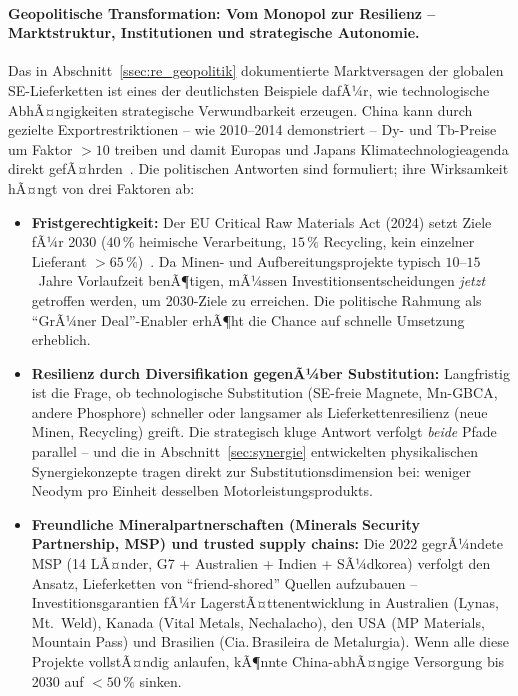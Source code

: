﻿\documentclass[12pt, a4paper]{report}
\theoremstyle{definition}
\theoremstyle{remark}
\begin{document}
\paragraph{Geopolitische Transformation: Vom Monopol zur Resilienz --
Marktstruktur, Institutionen und strategische Autonomie.}
Das in Abschnitt~\ref{ssec:re_geopolitik} dokumentierte Marktversagen
der globalen SE-Lieferketten ist eines der deutlichsten Beispiele dafÃ¼r,
wie technologische AbhÃ¤ngigkeiten strategische Verwundbarkeit erzeugen.
China kann durch gezielte Export\-restriktionen -- wie 2010--2014 demonstriert --
Dy- und Tb-Preise um Faktor $>10$ treiben und damit Europas und Japans
Klimatechnologieagenda direkt gefÃ¤hrden~\cite{massari2013}. Die politischen
Antworten sind formuliert; ihre Wirksamkeit hÃ¤ngt von drei Faktoren ab:

\begin{itemize}
  \item \textbf{Fristgerechtigkeit:} Der EU Critical Raw Materials Act (2024)
    setzt Ziele fÃ¼r 2030 ($40\,\%$ heimische Verarbeitung, $15\,\%$
    Recycling, kein einzelner Lieferant $>65\,\%$)~\cite{eu2023}. Da Minen-
    und Aufbereitungsprojekte typisch $10$--$15$~Jahre Vorlaufzeit
    benÃ¶tigen, mÃ¼ssen Investitions\-entscheidungen \emph{jetzt} getroffen
    werden, um 2030-Ziele zu erreichen. Die politische Rahmung als
    ``GrÃ¼ner Deal''-Enabler erhÃ¶ht die Chance auf schnelle Umsetzung
    erheblich.

  \item \textbf{Resilienz durch Diversifikation gegenÃ¼ber Substitution:}
    Langfristig ist die Frage, ob technologische Substitution (SE-freie
    Magnete, Mn-GBCA, andere Phosphore) schneller oder langsamer als
    Lieferkettenresilienz (neue Minen, Recycling) greift. Die strategisch
    kluge Antwort verfolgt \emph{beide} Pfade parallel -- und die in
    Abschnitt~\ref{sec:synergie} entwickelten physikalischen Synergiekonzepte
    tragen direkt zur Substitutionsdimension bei: weniger Neodym pro Einheit
    desselben Motorleistungsprodukts.

  \item \textbf{Freundliche Mineralpartnerschaften (Minerals Security Partnership,
    MSP) und trusted supply chains:}
    Die 2022 gegrÃ¼ndete MSP (14 LÃ¤nder, G7 + Australien + Indien + SÃ¼dkorea)
    verfolgt den Ansatz, Lieferketten von ``friend-shored'' Quellen aufzubauen --
    Investitionsgarantien fÃ¼r LagerstÃ¤ttenentwicklung in Australien
    (Lynas, Mt.~Weld), Kanada (Vital Metals, Nechalacho), den USA
    (MP Materials, Mountain Pass) und Brasilien (Cia.\,Brasileira de
    Metalurgia). Wenn alle diese Projekte vollstÃ¤ndig anlaufen, kÃ¶nnte
    China-abhÃ¤ngige Versorgung bis 2030 auf $< 50\,\%$ sinken.
\end{itemize}
\end{document}
